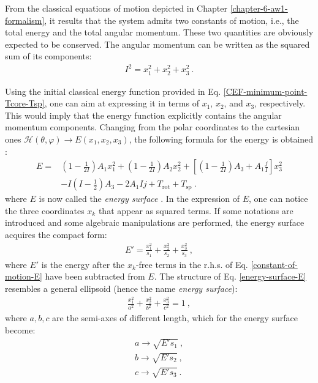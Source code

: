 From the classical equations of motion depicted in Chapter \ref{chapter-6-aw1-formalism}, it results that the system admits two constants of motion, i.e., the total energy and the total angular momentum. These two quantities are obviously expected to be conserved. The angular momentum can be written as the squared sum of its components:
\begin{align}
    I^2=x_1^2+x_2^2+x_3^2\ .
    \label{constant-of-motion-I}
\end{align}

Using the initial classical energy function provided in Eq. \ref{CEF-minimum-point-Tcore-Tsp}, one can aim at expressing it in terms of $x_1$, $x_2$, and $x_3$, respectively. This would imply that the energy function explicitly contains the angular momentum components. Changing from the polar coordinates to the cartesian ones $\mathcal{H}(\theta,\varphi)\longrightarrow E(x_1,x_2,x_3)$, the following formula for the energy is obtained \cite{poenaru2021extensive2}:
\begin{align}
    E=&\left(1-\frac{1}{2I}\right)A_1x_1^2+\left(1-\frac{1}{2I}\right)A_2x_2^2+\left[\left(1-\frac{1}{2I}\right)A_3+A_1\frac{j}{I}\right]x_3^2\nonumber\\
    &-I\left(I-\frac{1}{2}\right)A_3-2A_1Ij+T_\text{rot}+T_\text{sp}\ .
    \label{constant-of-motion-E}
\end{align}
where $E$ is now called the \emph{energy surface} \cite{poenaru2021extensive2}. In the expression of $E$, one can notice the three coordinates $x_k$ that appear as squared terms. If some notations are introduced and some algebraic manipulations are performed, the energy surface acquires the compact form:
\begin{align}
    E'=\frac{x_1^2}{s_1}+\frac{x_2^2}{s_2}+\frac{x_3^2}{s_3}\ ,
    \label{energy-surface-E}
\end{align}
where $E'$ is the energy after the $x_k$-free terms in the r.h.s. of Eq. \ref{constant-of-motion-E} have been subtracted from $E$. The structure of Eq. \ref{energy-surface-E} resembles a general ellipsoid (hence the name \emph{energy surface}):
\begin{align}
    \frac{x_1^2}{a^2}+\frac{x_2^2}{b^2}+\frac{x_3^2}{c^2}=1\ ,
\end{align}
where $a,b,c$ are the semi-axes of different length, which for the energy surface become:
\begin{align}
    a\to\sqrt{E's_1}\nonumber\ ,\\
    b\to\sqrt{E's_2}\nonumber\ ,\\
    c\to\sqrt{E's_3}\ .
    \label{semi-axes-lenghts-E}
\end{align}

